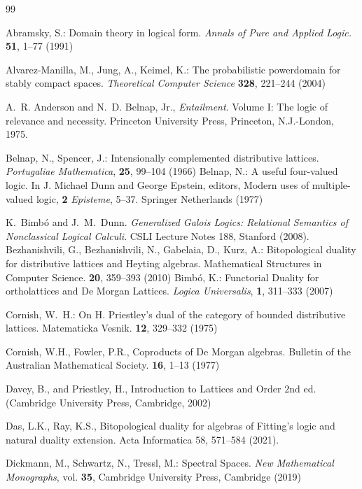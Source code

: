 \documentclass{amsart}
\theoremstyle{plain}
\theoremstyle{definition}
\begin{document}
\begin{thebibliography}{99}

 Abramsky, S.: Domain theory in logical form. \emph{Annals of Pure and Applied Logic.} \textbf{51}, 1--77 (1991)

 Alvarez-Manilla, M., Jung, A., Keimel, K.: The probabilistic powerdomain for stably compact spaces.
\emph{Theoretical Computer Science} \textbf{328}, 221--244 (2004)

A.~R. Anderson and N.~D. Belnap, Jr.,
\newblock \emph{Entailment}. Volume I: The logic of relevance and necessity.
\newblock Princeton University Press, Princeton, N.J.-London, 1975.


 Belnap, N., Spencer, J.: Intensionally complemented distributive lattices. \emph{Portugaliae Mathematica}, \textbf{25}, 99--104 (1966)
 Belnap, N.: A useful four-valued logic. In J. Michael Dunn and George Epstein, editors, Modern uses
of multiple-valued logic, \textbf{2} \emph{Episteme}, 5--37. Springer Netherlands (1977)

K.~Bimb\'o and J.~M.~Dunn.
\newblock \emph{Generalized Galois Logics: Relational Semantics of Nonclassical Logical Calculi}.
\newblock CSLI Lecture Notes 188, Stanford (2008).
  Bezhanishvili, G., Bezhanishvili, N., Gabelaia, D., Kurz, A.: Bitopological duality for distributive lattices and Heyting algebras. Mathematical Structures in Computer Science. \textbf{20}, 359--393 (2010) 
  Bimb\'o, K.: Functorial Duality for ortholattices and De Morgan Lattices. \emph{Logica Universalis}, \textbf{1}, 311--333 (2007)

 Cornish, W.~H.: On H. Priestley’s dual of the category of bounded distributive lattices. Matematicka
Vesnik. \textbf{12}, 329--332 (1975)

 Cornish, W.H., Fowler, P.R., Coproducts of De Morgan algebras. Bulletin of the Australian Mathematical Society. \textbf{16}, 1--13 (1977)

 Davey, B., and Priestley, H., Introduction to Lattices and Order $2\text{nd}$ ed. (Cambridge University Press, Cambridge, 2002)

 Das, L.K., Ray, K.S., Bitopological duality for algebras of Fitting’s logic and natural duality extension. Acta Informatica 58, 571–584 (2021).

 Dickmann, M., Schwartz, N., Tressl, M.: Spectral Spaces. \emph{New Mathematical Monographs}, vol. \textbf{35}, Cambridge University Press, Cambridge (2019)


\end{thebibliography}
\end{document}
